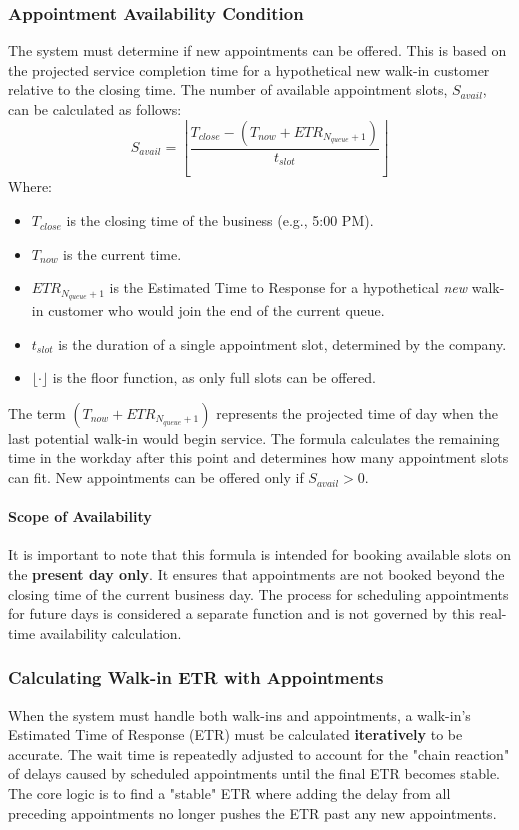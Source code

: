 \documentclass{article}
\begin{document}
\subsubsection{Appointment Availability Condition}
The system must determine if new appointments can be offered. This is based on the projected service completion time for a hypothetical new walk-in customer relative to the closing time. The number of available appointment slots, $S_{avail}$, can be calculated as follows:
\begin{equation}
    S_{avail} = \left\lfloor \frac{T_{close} - (T_{now} + ETR_{N_{queue}+1})}{t_{slot}} \right\rfloor
\end{equation}
Where:
\begin{itemize}
    \item $T_{close}$ is the closing time of the business (e.g., 5:00 PM).
    \item $T_{now}$ is the current time.
    \item $ETR_{N_{queue}+1}$ is the Estimated Time to Response for a hypothetical \textit{new} walk-in customer who would join the end of the current queue.
    \item $t_{slot}$ is the duration of a single appointment slot, determined by the company.
    \item $\lfloor \cdot \rfloor$ is the floor function, as only full slots can be offered.
\end{itemize}
The term $(T_{now} + ETR_{N_{queue}+1})$ represents the projected time of day when the last potential walk-in would begin service. The formula calculates the remaining time in the workday after this point and determines how many appointment slots can fit. New appointments can be offered only if $S_{avail} > 0$.

\paragraph{Scope of Availability} It is important to note that this formula is intended for booking available slots on the \textbf{present day only}. It ensures that appointments are not booked beyond the closing time of the current business day. The process for scheduling appointments for future days is considered a separate function and is not governed by this real-time availability calculation.


\subsubsection{Calculating Walk-in ETR with Appointments}
When the system must handle both walk-ins and appointments, a walk-in's Estimated Time of Response (ETR) must be calculated \textbf{iteratively} to be accurate. The wait time is repeatedly adjusted to account for the "chain reaction" of delays caused by scheduled appointments until the final ETR becomes stable. The core logic is to find a "stable" ETR where adding the delay from all preceding appointments no longer pushes the ETR past any new appointments.
\end{document}

